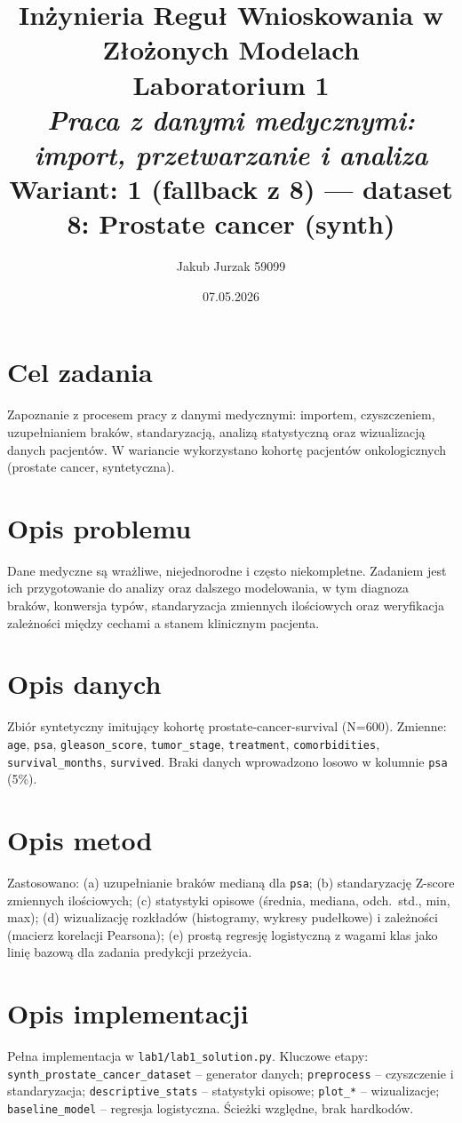 \documentclass[12pt,a4paper]{article}
\title{
  \vspace{2cm}
  \LARGE\textbf{Inżynieria Reguł Wnioskowania w Złożonych Modelach}\\[0.6cm]
  \Large Laboratorium 1\\[0.4cm]
  \large \textit{Praca z danymi medycznymi: import, przetwarzanie i analiza}\\[0.3cm]
  \normalsize Wariant: \textbf{1 (fallback z 8) — dataset 8: Prostate cancer (synth)}
}
\author{Jakub Jurzak 59099}
\date{07.05.2026}
\begin{document}
\maketitle
\thispagestyle{empty}
\newpage

\tableofcontents
\newpage

\section{Cel zadania}
Zapoznanie z procesem pracy z danymi medycznymi: importem, czyszczeniem, uzupełnianiem braków, standaryzacją, analizą statystyczną oraz wizualizacją danych pacjentów. W wariancie wykorzystano kohortę pacjentów onkologicznych (prostate cancer, syntetyczna).

\section{Opis problemu}
Dane medyczne są wrażliwe, niejednorodne i często niekompletne. Zadaniem jest ich przygotowanie do analizy oraz dalszego modelowania, w tym diagnoza braków, konwersja typów, standaryzacja zmiennych ilościowych oraz weryfikacja zależności między cechami a stanem klinicznym pacjenta.

\section{Opis danych}
Zbiór syntetyczny imitujący kohortę prostate-cancer-survival (N=600). Zmienne: \texttt{age}, \texttt{psa}, \texttt{gleason\_score}, \texttt{tumor\_stage}, \texttt{treatment}, \texttt{comorbidities}, \texttt{survival\_months}, \texttt{survived}. Braki danych wprowadzono losowo w kolumnie \texttt{psa} (5\%).

\section{Opis metod}
Zastosowano: (a) uzupełnianie braków medianą dla \texttt{psa}; (b) standaryzację Z-score zmiennych ilościowych; (c) statystyki opisowe (średnia, mediana, odch.\ std., min, max); (d) wizualizację rozkładów (histogramy, wykresy pudełkowe) i zależności (macierz korelacji Pearsona); (e) prostą regresję logistyczną z wagami klas jako linię bazową dla zadania predykcji przeżycia.

\section{Opis implementacji}
Pełna implementacja w \texttt{lab1/lab1\_solution.py}. Kluczowe etapy: \texttt{synth\_prostate\_cancer\_dataset} -- generator danych; \texttt{preprocess} -- czyszczenie i standaryzacja; \texttt{descriptive\_stats} -- statystyki opisowe; \texttt{plot\_*} -- wizualizacje; \texttt{baseline\_model} -- regresja logistyczna. Ścieżki względne, brak hardkodów.
\end{document}
